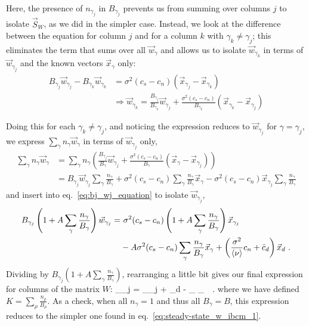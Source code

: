 Here, the presence of $n_{\gamma_j}$ in $B_{\gamma_j}$ prevents us from summing over columns $j$ to isolate $\vec{S}_W$, as we did in the simpler case. Instead, we look at the difference between the equation for column $j$ and for a column $k$ with $\gamma_k \neq \gamma_j$; this eliminates the term that sums over all $\vec{w}_{\gamma}$ and allows us to isolate $\vec{w}_{\gamma_k}$ in terms of $\vec{w}_{\gamma_j}$ and the known vectors $\vec{x}_{\gamma}$ only:
\begin{align}
	B_{\gamma_j} \vec{w}_{\gamma_j} - B_{\gamma_k} \vec{w}_{\gamma_k} &= \sigma^2 (c_s - c_n) (\vec{x}_{\gamma_j} - \vec{x}_{\gamma_k})	\nonumber \\
	& \Rightarrow \vec{w}_{\gamma_k} = \frac{B_{\gamma_j}}{B_{\gamma_k}} \vec{w}_{\gamma_j} + \frac{\sigma^2 (c_s - c_n)}{B_{\gamma_k}} (\vec{x}_{\gamma_k} - \vec{x}_{\gamma_j})
\end{align}

Doing this for each $\gamma_k \neq \gamma_j$, and noticing the expression reduces to $\vec{w}_{\gamma_j}$ for $\gamma = \gamma_j$, we express $\sum_{\gamma} n_{\gamma} \vec{w}_{\gamma}$ in terms of $\vec{w}_{\gamma_j}$ only, 
\begin{align*}
	\sum_{\gamma} n_{\gamma} \vec{w}_{\gamma} &= \sum_{\gamma} n_{\gamma} \left( \frac{B_{\gamma_j}}{B_\gamma} \vec{w}_{\gamma_j} + \frac{\sigma^2 (c_s - c_n)}{B_\gamma} (\vec{x}_{\gamma} - \vec{x}_{\gamma_j}) \right)	\\
	&= B_{\gamma_j} \vec{w}_{\gamma_j} \sum_{\gamma} \frac{n_{\gamma}}{B_{\gamma}} + \sigma^2 (c_s - c_n) \sum_{\gamma} \frac{n_{\gamma}}{B_{\gamma}} \vec{x}_{\gamma} - \sigma^2 (c_s - c_n) \vec{x}_{\gamma_j} \sum_{\gamma} \frac{n_{\gamma}}{B_{\gamma}}
\end{align*}
and insert into eq.~\eqref{eq:bj_wj_equation} to isolate $\vec{w}_{\gamma_j}$,
\begin{align*}
	B_{\gamma_j} \left(1 + A \sum_{\gamma} \frac{n_{\gamma}}{B_{\gamma}} \right) \vec{w}_{\gamma_j} =& \,\, \sigma^2 (c_s - c_n) \left(1 + A \sum_{\gamma} \frac{n_{\gamma}}{B_{\gamma}} \right) \vec{x}_{\gamma_j}	\\	
	& - A \sigma^2 (c_s - c_n) \sum_{\gamma} \frac{n_{\gamma}}{B_{\gamma}} \vec{x}_{\gamma} + \left(\frac{\sigma^2}{\braket{\nu}} c_n +  \bar{c}_d \right) \vec{x}_d	\,\, .
\end{align*}
Dividing by $B_{\gamma_j} \left(1 + A \sum_{\gamma} \frac{n_{\gamma}}{B_{\gamma}} \right)$, rearranging a little bit gives our final expression for columns of the matrix $W$:
\beq
	_{\gamma_j} =  _{\gamma_j} +  _d -  \sum_{\gamma}  _{\gamma} \,\, .
	\label{eq:general_wj_ibcm}
\eeq
where we have defined $K = \sum_{\rho} \frac{n_{\rho}}{B_{\rho}}$. As a check, when all $n_{\gamma}=1$ and thus all $B_{\gamma} = B$, this expression reduces to the simpler one found in eq.~\eqref{eq:steady-state_w_ibcm_1}. 

